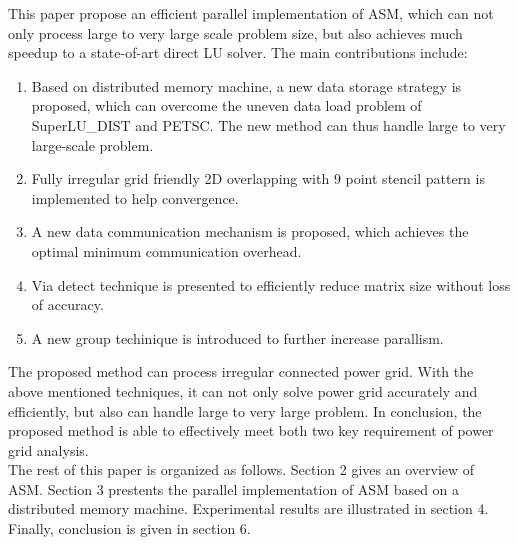 \documentclass{sig-alternate}
\begin{document}
	This paper propose an efficient parallel implementation of ASM, which can not only process large to very large scale problem size, 
	but also achieves much speedup to a state-of-art direct LU solver. The main contributions include:\\
	\begin{enumerate}[1)]
	\item Based on distributed memory machine, a new data storage strategy is proposed, which can overcome the uneven data 
	load problem of SuperLU\_DIST and PETSC. The new method can thus handle large to very large-scale problem.
	\item Fully irregular grid friendly 2D overlapping with 9 point stencil pattern is implemented to help convergence. 
	\item A new data communication mechanism is proposed, which achieves the optimal minimum communication overhead.
	\item Via detect technique is presented to efficiently reduce matrix size without loss of accuracy.
	\item A new group techinique is introduced to further increase parallism.\\
	\end{enumerate}

	The proposed method can process irregular connected power grid. With the above mentioned techniques, it can not only solve 
	power grid accurately and efficiently, but also can handle large to very large problem. In conclusion, the proposed method 
	is able to effectively meet both two key requirement of power grid analysis.\\

	The rest of this paper is organized as follows. Section 2 gives an overview of ASM. Section 3 prestents 
	the parallel implementation of ASM based on a distributed memory machine. Experimental results are illustrated in section 4. 
	Finally, conclusion is given in section 6.
\end{document}

